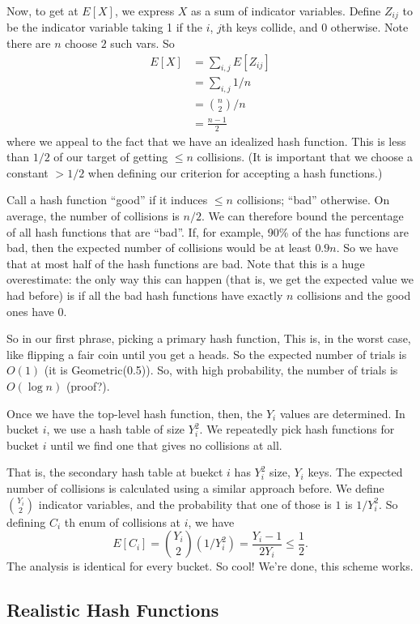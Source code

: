 \documentclass{article}
\begin{document}
Now, to get at $E[X]$, we express $X$ as a sum of indicator variables.
Define $Z_{ij}$ to be the indicator variable taking 1 if the $i$, $j$th keys
collide, and 0 otherwise.
Note there are $n$ choose $2$ such vars.
So
\begin{align}
E[X] 
&=
\sum_{i,j} E[Z_{ij}]  \\
&=
\sum_{i,j} 1/n \\
&=
{n \choose 2} / n
\\
&= 
\frac{n-1}{2}
\end{align}
where we appeal to the fact that we have an idealized hash function.
This is less than $1/2$ of our target of getting $\leq n$ collisions.
(It is important that we choose a constant $> 1/2$ when defining
our criterion for accepting a hash functions.)

Call a hash function ``good'' if it induces $\leq n$ collisions; ``bad'' otherwise.
On average, the number of collisions is $n/2$.
We can therefore bound the percentage of all hash functions that
are ``bad''.
If, for example, 90\% of the has functions are bad, then the expected
number of collisions would be at least $0.9n$.
So we have that at most half of the hash functions are bad.
Note that this is a huge overestimate: the only way
this can happen (that is, we get the expected value we had before)
 is if all the bad hash functions have exactly $n$ collisions and the
 good ones have $0$.

So in our first phrase, picking a primary hash function,
This is, in the worst case, like flipping a fair coin until you get
a heads.
So the expected number of trials is $O(1)$ (it is Geometric(0.5)).
So, with high probability, the number of trials is $O(\log n)$ (proof?).

Once we have the top-level hash function, then, the $Y_i$ values are determined.
In bucket $i$, we use a hash table of size $Y_i^2$.
We repeatedly pick hash functions for bucket $i$ until we find one
that gives no collisions at all.

That is, the secondary hash table at buekct $i$ has $Y_i^2$ size, $Y_i$ keys.
The expected number of collisions is calculated using a similar approach
before.
We define ${Y_i\choose 2}$ indicator variables, and the probability that
one of those is $1$ is $1 / Y_i^2$.
So defining $C_i$ th enum of collisions at $i$, we have
$$
E[C_i] = 
{Y_i\choose 2} (1 / Y_i^2)
=
\frac{Y_i - 1}{2Y_i}
\leq \frac{1}{2}.
$$
The analysis is identical for every bucket.
So cool! We're done, this scheme works.

\subsection{Realistic Hash Functions}
\end{document}
